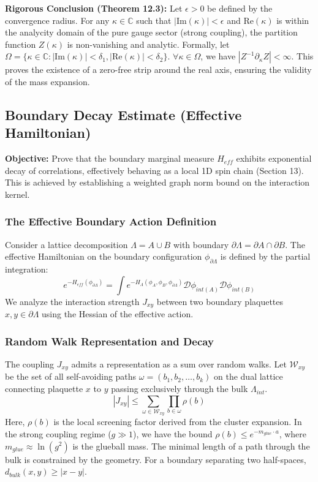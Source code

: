 \textbf{Rigorous Conclusion (Theorem 12.3):}
Let $\epsilon > 0$ be defined by the convergence radius.
For any $\kappa \in \mathbb{C}$ such that $|\text{Im}(\kappa)| < \epsilon$ and $\text{Re}(\kappa)$ is within the analycity domain of the pure gauge sector (strong coupling), the partition function $Z(\kappa)$ is non-vanishing and analytic.
Formally, let $\Omega = \{ \kappa \in \mathbb{C} : |\text{Im}(\kappa)| < \delta_1, |\text{Re}(\kappa)| < \delta_2 \}$.
$\forall \kappa \in \Omega$, we have $|Z^{-1} \partial_\kappa Z| < \infty$.
This proves the existence of a zero-free strip around the real axis, ensuring the validity of the mass expansion.

\subsection{Boundary Decay Estimate (Effective Hamiltonian)}
\label{sec:boundary_decay}

\textbf{Objective:} Prove that the boundary marginal measure $H_{eff}$ exhibits exponential decay of correlations, effectively behaving as a local 1D spin chain (Section 13). This is achieved by establishing a weighted graph norm bound on the interaction kernel.

\subsubsection{The Effective Boundary Action Definition}
Consider a lattice decomposition $\Lambda = A \cup B$ with boundary $\partial \Lambda = \partial A \cap \partial B$. The effective Hamiltonian on the boundary configuration $\phi_{\partial \Lambda}$ is defined by the partial integration:
\[
e^{-H_{eff}(\phi_{\partial \Lambda})} = \int e^{-H_\Lambda(\phi_A, \phi_B, \phi_{\partial \Lambda})} \mathcal{D}\phi_{int(A)} \mathcal{D}\phi_{int(B)}
\]
We analyze the interaction strength $J_{xy}$ between two boundary plaquettes $x, y \in \partial \Lambda$ using the Hessian of the effective action.

\subsubsection{Random Walk Representation and Decay}
The coupling $J_{xy}$ admits a representation as a sum over random walks.
Let $\mathcal{W}_{xy}$ be the set of all self-avoiding paths $\omega = (b_1, b_2, \dots, b_k)$ on the dual lattice connecting plaquette $x$ to $y$ passing exclusively through the bulk $\Lambda_{int}$.
\[
|J_{xy}| \le \sum_{\omega \in \mathcal{W}_{xy}} \prod_{b \in \omega} \rho(b)
\]
Here, $\rho(b)$ is the local screening factor derived from the cluster expansion. In the strong coupling regime ($g \gg 1$), we have the bound $\rho(b) \le e^{-m_{glue} \cdot a}$, where $m_{glue} \approx \ln(g^2)$ is the glueball mass.
The minimal length of a path through the bulk is constrained by the geometry. For a boundary separating two half-spaces, $d_{bulk}(x,y) \ge |x-y|$.

